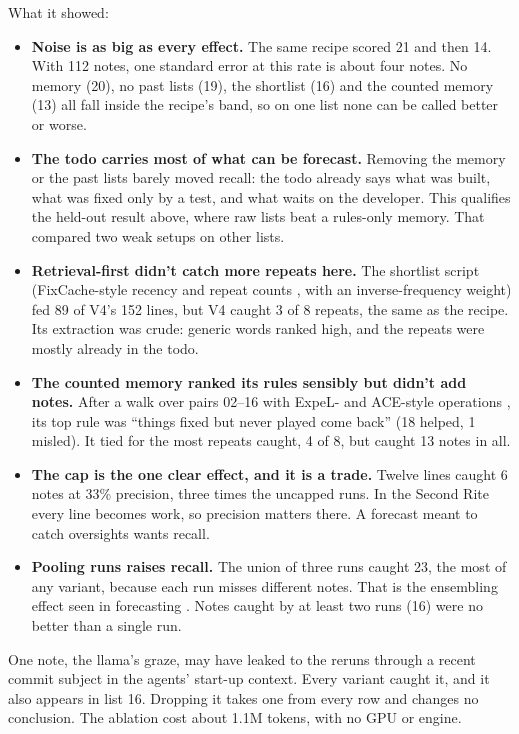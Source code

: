 \documentclass[10pt]{article}
\begin{document}
What it showed:
\begin{itemize}[leftmargin=*]
  \item \textbf{Noise is as big as every effect.} The same recipe scored 21 and then 14. With 112 notes, one standard error at this rate is about four notes. No memory (20), no past lists (19), the shortlist (16) and the counted memory (13) all fall inside the recipe's band, so on one list none can be called better or worse.
  \item \textbf{The todo carries most of what can be forecast.} Removing the memory or the past lists barely moved recall: the todo already says what was built, what was fixed only by a test, and what waits on the developer. This qualifies the held-out result above, where raw lists beat a rules-only memory. That compared two weak setups on other lists.
  \item \textbf{Retrieval-first didn't catch more repeats here.} The shortlist script (FixCache-style recency and repeat counts \citep{kim2007predicting}, with an inverse-frequency weight) fed 89 of V4's 152 lines, but V4 caught 3 of 8 repeats, the same as the recipe. Its extraction was crude: generic words ranked high, and the repeats were mostly already in the todo.
  \item \textbf{The counted memory ranked its rules sensibly but didn't add notes.} After a walk over pairs 02--16 with ExpeL- and ACE-style operations \citep{zhao2024expel, zhang2026ace}, its top rule was ``things fixed but never played come back'' (18 helped, 1 misled). It tied for the most repeats caught, 4 of 8, but caught 13 notes in all.
  \item \textbf{The cap is the one clear effect, and it is a trade.} Twelve lines caught 6 notes at 33\% precision, three times the uncapped runs. In the Second Rite every line becomes work, so precision matters there. A forecast meant to catch oversights wants recall.
  \item \textbf{Pooling runs raises recall.} The union of three runs caught 23, the most of any variant, because each run misses different notes. That is the ensembling effect seen in forecasting \citep{halawi2024approaching}. Notes caught by at least two runs (16) were no better than a single run.
\end{itemize}
One note, the llama's graze, may have leaked to the reruns through a recent commit subject in the agents' start-up context. Every variant caught it, and it also appears in list 16. Dropping it takes one from every row and changes no conclusion. The ablation cost about 1.1M tokens, with no GPU or engine.
\end{document}
